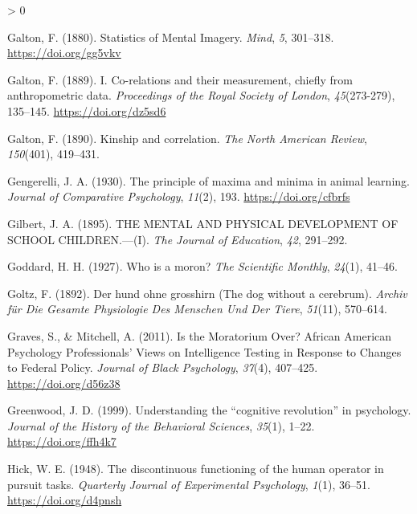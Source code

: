 \documentclass[
  oneside,
  12pt]{crumpbook}
\newlength{\cslhangindent}
\newenvironment{CSLReferences}[2] %
 {%
  \setlength{\parindent}{0pt}
  \ifodd #1 \everypar{\setlength{\hangindent}{\cslhangindent}}\ignorespaces\fi
  \ifnum #2 > 0
  \setlength{\parskip}{#2\baselineskip}
  \fi
 }%
 {}
\begin{document}
\begin{CSLReferences}{1}{0}
\leavevmode\hypertarget{ref-galtonStatisticsMentalImagery1880}{}%
Galton, F. (1880). Statistics of {Mental Imagery}. \emph{Mind}, \emph{5}, 301--318. \url{https://doi.org/gg5vkv}

\leavevmode\hypertarget{ref-galtonCorelationsTheirMeasurement1889}{}%
Galton, F. (1889). I. {Co}-relations and their measurement, chiefly from anthropometric data. \emph{Proceedings of the Royal Society of London}, \emph{45}(273-279), 135--145. \url{https://doi.org/dz5sd6}

\leavevmode\hypertarget{ref-galtonKinshipCorrelation1890}{}%
Galton, F. (1890). Kinship and correlation. \emph{The North American Review}, \emph{150}(401), 419--431.

\leavevmode\hypertarget{ref-gengerelliPrincipleMaximaMinima1930}{}%
Gengerelli, J. A. (1930). The principle of maxima and minima in animal learning. \emph{Journal of Comparative Psychology}, \emph{11}(2), 193. \url{https://doi.org/cfbrfs}

\leavevmode\hypertarget{ref-gilbertMENTALPHYSICALDEVELOPMENT1895}{}%
Gilbert, J. A. (1895). {THE MENTAL AND PHYSICAL DEVELOPMENT OF SCHOOL CHILDREN}.---({I}). \emph{The Journal of Education}, \emph{42}, 291--292.

\leavevmode\hypertarget{ref-goddardWhoMoron1927}{}%
Goddard, H. H. (1927). Who is a moron? \emph{The Scientific Monthly}, \emph{24}(1), 41--46.

\leavevmode\hypertarget{ref-goltzHundOhneGrosshirn1892}{}%
Goltz, F. (1892). Der hund ohne grosshirn ({The} dog without a cerebrum). \emph{Archiv für Die Gesamte Physiologie Des Menschen Und Der Tiere}, \emph{51}(11), 570--614.

\leavevmode\hypertarget{ref-gravesMoratoriumAfricanAmerican2011}{}%
Graves, S., \& Mitchell, A. (2011). Is the {Moratorium Over}? {African American Psychology Professionals}' {Views} on {Intelligence Testing} in {Response} to {Changes} to {Federal Policy}. \emph{Journal of Black Psychology}, \emph{37}(4), 407--425. \url{https://doi.org/d56z38}

\leavevmode\hypertarget{ref-greenwoodUnderstandingCognitiveRevolution1999}{}%
Greenwood, J. D. (1999). Understanding the {``cognitive revolution''} in psychology. \emph{Journal of the History of the Behavioral Sciences}, \emph{35}(1), 1--22. \url{https://doi.org/ffh4k7}

\leavevmode\hypertarget{ref-hickDiscontinuousFunctioningHuman1948}{}%
Hick, W. E. (1948). The discontinuous functioning of the human operator in pursuit tasks. \emph{Quarterly Journal of Experimental Psychology}, \emph{1}(1), 36--51. \url{https://doi.org/d4pnsh}


\end{CSLReferences}
\end{document}

